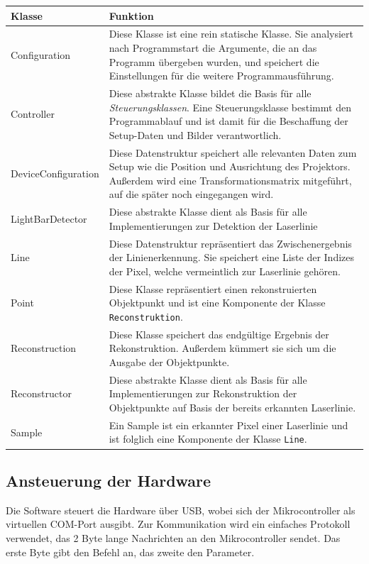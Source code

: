 \documentclass[ngerman,a4paper,parskip=half]{scrartcl}
\begin{document}
\begin{tabular}{l|p{10cm}}
	\bfseries Klasse    & \bfseries Funktion\\
	\hline
	Configuration       &
		Diese Klasse ist eine rein statische Klasse. Sie analysiert nach Programmstart die Argumente, die an das Programm übergeben wurden, und speichert die Einstellungen für die weitere Programmausführung.\\
	\hline
	Controller          &
		Diese abstrakte Klasse bildet die Basis für alle \emph{Steuerungsklassen}. Eine Steuerungsklasse bestimmt den Programmablauf und ist damit für die Beschaffung der Setup-Daten und Bilder verantwortlich.\\
	\hline
	DeviceConfiguration &
		Diese Datenstruktur speichert alle relevanten Daten zum Setup wie die Position und Ausrichtung des Projektors. Außerdem wird eine Transformationsmatrix mitgeführt, auf die später noch eingegangen wird.\\
	\hline
	LightBarDetector    &
		Diese abstrakte Klasse dient als Basis für alle Implementierungen zur Detektion der Laserlinie\\
	\hline
	Line                &
		Diese Datenstruktur repräsentiert das Zwischenergebnis der Linienerkennung. Sie speichert eine Liste der Indizes der Pixel, welche vermeintlich zur Laserlinie gehören.\\
	\hline
	Point               &
		Diese Klasse repräsentiert einen rekonstruierten Objektpunkt und ist eine Komponente der Klasse \texttt{Reconstruktion}.\\
	\hline
	Reconstruction      &
		Diese Klasse speichert das endgültige Ergebnis der Rekonstruktion. Außerdem kümmert sie sich um die Ausgabe der Objektpunkte.\\
	\hline
	Reconstructor       &
		Diese abstrakte Klasse dient als Basis für alle Implementierungen zur Rekonstruktion der Objektpunkte auf Basis der bereits erkannten Laserlinie.\\
	\hline
	Sample              &
		Ein Sample ist ein erkannter Pixel einer Laserlinie und ist folglich eine Komponente der Klasse \texttt{Line}.\\
	\hline
\end{tabular}

\subsection{Ansteuerung der Hardware}

Die Software steuert die Hardware über USB, wobei sich der Mikrocontroller als virtuellen COM-Port ausgibt. Zur Kommunikation wird ein einfaches Protokoll verwendet, das 2 Byte lange Nachrichten an den Mikrocontroller sendet. Das erste Byte gibt den Befehl an, das zweite den Parameter.\\
\end{document}
